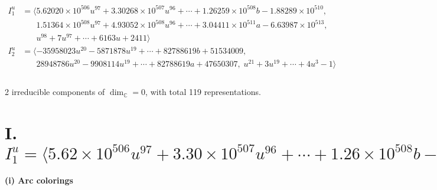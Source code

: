 \documentclass[1p]{elsarticle_modified}
\theoremstyle{definition}
\begin{document}
\begin{align*}
I^u_{1}&=\langle 
5.62020\times10^{506} u^{97}+3.30268\times10^{507} u^{96}+\cdots+1.26259\times10^{508} b-1.88289\times10^{510},\\
\phantom{I^u_{1}}&\phantom{= \langle  }1.51364\times10^{508} u^{97}+4.93052\times10^{508} u^{96}+\cdots+3.04411\times10^{511} a-6.63987\times10^{513},\\
\phantom{I^u_{1}}&\phantom{= \langle  }u^{98}+7 u^{97}+\cdots+6163 u+2411\rangle \\
I^u_{2}&=\langle 
-35958023 u^{20}-5871878 u^{19}+\cdots+82788619 b+51534009,\\
\phantom{I^u_{2}}&\phantom{= \langle  }28948786 u^{20}-9908114 u^{19}+\cdots+82788619 a+47650307,\;u^{21}+3 u^{19}+\cdots+4 u^3-1\rangle \\
\\
\end{align*}
\raggedright * 2 irreducible components of $\dim_{\mathbb{C}}=0$, with total 119 representations.\\
\newpage
\renewcommand{\arraystretch}{1}
\centering \section*{I. $I^u_{1}= \langle 5.62\times10^{506} u^{97}+3.30\times10^{507} u^{96}+\cdots+1.26\times10^{508} b-1.88\times10^{510},\;1.51\times10^{508} u^{97}+4.93\times10^{508} u^{96}+\cdots+3.04\times10^{511} a-6.64\times10^{513},\;u^{98}+7 u^{97}+\cdots+6163 u+2411 \rangle$}
\flushleft \textbf{(i) Arc colorings}\\
\end{document}
